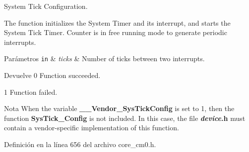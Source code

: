 System Tick Configuration. 

The function initializes the System Timer and its interrupt, and starts the System Tick Timer. Counter is in free running mode to generate periodic interrupts.


\begin{DoxyParams}[1]{Parámetros}
\mbox{\tt in}  & {\em ticks} & Number of ticks between two interrupts.\\
\hline
\end{DoxyParams}
\begin{DoxyReturn}{Devuelve}
0 Function succeeded. 

1 Function failed.
\end{DoxyReturn}
\begin{DoxyNote}{Nota}
When the variable {\bfseries \+\_\+\+\_\+\+Vendor\+\_\+\+Sys\+Tick\+Config} is set to 1, then the function {\bfseries Sys\+Tick\+\_\+\+Config} is not included. In this case, the file {\bfseries {\itshape device}.h} must contain a vendor-\/specific implementation of this function. 
\end{DoxyNote}


Definición en la línea 656 del archivo core\+\_\+cm0.\+h.

